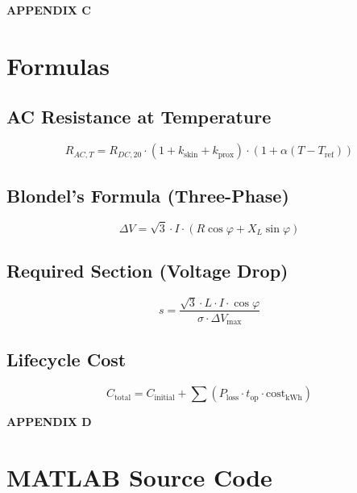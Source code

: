 \documentclass[12pt, a4paper]{article}
\begin{document}
\begin{center}\textbf{APPENDIX C}\end{center}
\section{Formulas}
\subsection{AC Resistance at Temperature}
\begin{equation}
    R_{AC, T} = R_{DC, 20} \cdot (1 + k_{\text{skin}} + k_{\text{prox}}) \cdot (1 + \alpha(T - T_{\text{ref}}))
\end{equation}
\subsection{Blondel's Formula (Three-Phase)}
\begin{equation}
    \Delta V = \sqrt{3} \cdot I \cdot (R \cos\varphi + X_L \sin\varphi)
\end{equation}
\subsection{Required Section (Voltage Drop)}
\begin{equation}
    s = \frac{\sqrt{3} \cdot L \cdot I \cdot \cos\varphi}{\sigma \cdot \Delta V_{\text{max}}}
\end{equation}
\subsection{Lifecycle Cost}
\begin{equation}
    C_{\text{total}} = C_{\text{initial}} + \sum (P_{\text{loss}} \cdot t_{\text{op}} \cdot \text{cost}_{\text{kWh}})
\end{equation}

\newpage
\begin{center}\textbf{APPENDIX D}\end{center}
\section{MATLAB Source Code}

\end{document}
